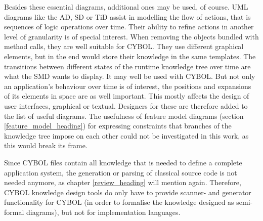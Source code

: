 Besides these essential diagrams, additional ones may be used, of course. UML
diagrams like the AD, SD or TiD assist in modelling the flow of actions, that
is sequences of logic operations over time. Their ability to refine actions in
another level of granularity is of special interest. When removing the objects
bundled with method calls, they are well suitable for CYBOL. They use different
graphical elements, but in the end would store their knowledge in the same
templates. The transitions between different states of the runtime knowledge
tree over time are what the SMD wants to display. It may well be used with
CYBOL. But not only an application's behaviour over time is of interest, the
positions and expansions of its elements in space are as well important. This
mostly affects the design of user interfaces, graphical or textual. Designers
for these are therefore added to the list of useful diagrams. The usefulness of
feature model diagrams (section \ref{feature_model_heading}) for expressing
constraints that branches of the knowledge tree impose on each other could not
be investigated in this work, as this would break its frame.

Since CYBOL files contain all knowledge that is needed to define a complete
application system, the generation or parsing of classical source code is not
needed anymore, as chapter \ref{review_heading} will mention again. Therefore,
CYBOL knowledge design tools do only have to provide scanner- and generator
functionality for CYBOL (in order to formalise the knowledge designed as
semi-formal diagrams), but not for implementation languages.
